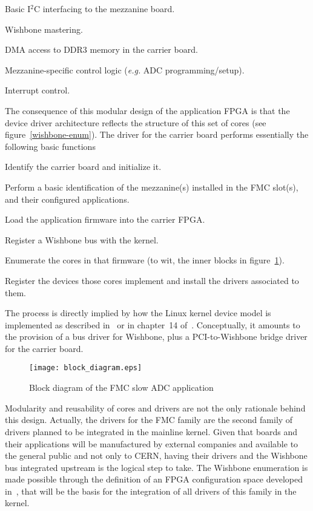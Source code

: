 \documentclass{JAC2003}
\begin{document}
\begin{Itemize}
\item Basic I${}^2$C interfacing to the mezzanine board.
\item Wishbone mastering.
\item DMA access to DDR3 memory in the carrier board.
\item Mezzanine-specific control logic (\emph{e.g.} ADC programming/setup).
\item Interrupt control.
\end{Itemize}
The consequence of this modular design of the application FPGA is that
the device driver architecture reflects the structure of this set of cores
(see figure~\ref{wishbone-enum}). The driver for the carrier board performs
essentially the following basic functions
\begin{Itemize}
\item Identify the carrier board and initialize it.
\item Perform a basic identification of the mezzanine(s) installed in
    the FMC slot(s), and their configured applications.
\item Load the application firmware into the carrier FPGA.
\item Register a Wishbone bus with the kernel.
\item Enumerate the cores in that firmware (to wit, the
    inner blocks in figure~\ref{slow-adc}).
\item Register the devices those cores implement and install the drivers
    associated to them.
\end{Itemize}
The process is directly implied by how the Linux kernel device model
is implemented as described in~\cite{device-model} or in chapter~14
of~\cite{rubini}. Conceptually, it amounts to the provision of a bus driver
for Wishbone, plus a PCI-to-Wishbone bridge driver for the carrier board.

\begin{figure}[t]
   \centering
   \texttt{[image: block\_diagram.eps]}
   \caption{Block diagram of the FMC slow ADC application}
   \label{slow-adc}
\end{figure}

Modularity and reusability of cores and drivers are not the only rationale
behind this design. Actually, the drivers for the FMC family are the second
family of drivers planned to be integrated in the mainline kernel. Given
that boards and their applications will be manufactured by external
companies and available to the general public and not only to CERN,
having their drivers and the Wishbone
bus integrated upstream is the logical step to take. The Wishbone enumeration is made
possible through the definition of an FPGA configuration space developed
in~\cite{fpga-config-space}, that will be the basis for the integration of
all drivers of this family in the kernel.
\end{document}
